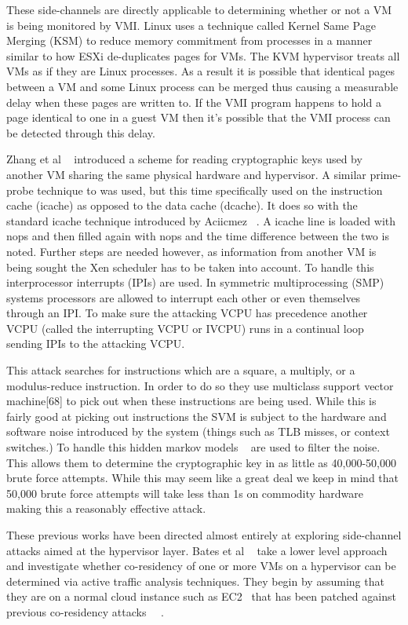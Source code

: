 These side-channels are directly applicable to determining whether or not a VM is being monitored by VMI. Linux uses a technique called Kernel Same Page Merging (KSM) to reduce memory commitment from processes in a manner similar to how ESXi de-duplicates pages for VMs. The KVM hypervisor treats all VMs as if they are Linux processes. As a result it is possible that identical pages between a VM and some Linux process can be merged thus causing a measurable delay when these pages are written to. If the VMI program happens to hold a page identical to one in a guest VM then it's possible that the VMI process can be detected through this delay. 

Zhang et al ~\cite{zhang_cross-vm_2012} introduced a scheme for reading cryptographic keys used by another VM sharing the same physical hardware and hypervisor. A similar prime-probe technique to was used, but this time specifically used on the instruction cache (icache) as opposed to the data cache (dcache). It does so with the standard icache technique introduced by Aciicmez ~\cite{aciiamez_yet_2007}. A icache line is loaded with nops and then filled again with nops and the time difference between the two is noted. Further steps are needed however, as information from another VM is being sought the Xen scheduler has to be taken into account. To handle this interprocessor interrupts (IPIs) are used. In symmetric multiprocessing (SMP) systems processors are allowed to interrupt each other or even themselves through an IPI. To make sure the attacking VCPU has precedence another VCPU (called the interrupting VCPU or IVCPU) runs in a continual loop sending IPIs to the attacking VCPU.

This attack searches for instructions which are a square, a multiply, or a modulus-reduce instruction. In order to do so they use multiclass support vector machine[68] to pick out when these instructions are being used. While this is fairly good at picking out instructions the SVM is subject to the hardware and software noise introduced by the system (things such as TLB misses, or context switches.) To handle this hidden markov models ~\cite{bishop_pattern_2006} are used to filter the noise. This allows them to determine the cryptographic key in as little as 40,000-50,000 brute force attempts. While this may seem like a great deal we keep in mind that 50,000 brute force attempts will take less than 1s on commodity hardware making this a reasonably effective attack. 

These previous works have been directed almost entirely at exploring side-channel attacks aimed at the hypervisor layer. Bates et al ~\cite{bates_detecting_2012} take a lower level approach and investigate whether co-residency of one or more VMs on a hypervisor can be determined via active traffic analysis techniques. They begin by assuming that they are on a normal cloud instance such as EC2~\cite{_aws_EC2_2014} that has been patched against previous co-residency attacks ~\cite{zhang_homealone:_2011}~\cite{ristenpart_hey_2009}. 

